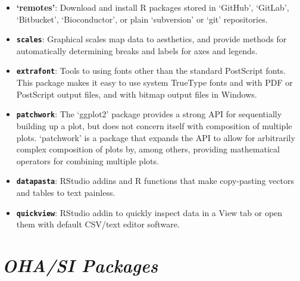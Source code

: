 \documentclass[
  letterpaper,
  DIV=11,
  numbers=noendperiod]{scrreprt}
\providecommand{\tightlist}{%
  \setlength{\itemsep}{0pt}\setlength{\parskip}{0pt}}\usepackage{longtable,booktabs,array}
\begin{document}
\begin{itemize}
\tightlist
\item
  \textbf{`remotes'}: Download and install R packages stored in
  `GitHub', `GitLab', `Bitbucket', `Bioconductor', or plain `subversion'
  or `git' repositories.
\item
  \textbf{\texttt{scales}}: Graphical scales map data to aesthetics, and
  provide methods for automatically determining breaks and labels for
  axes and legends.
\item
  \textbf{\texttt{extrafont}}: Tools to using fonts other than the
  standard PostScript fonts. This package makes it easy to use system
  TrueType fonts and with PDF or PostScript output files, and with
  bitmap output files in Windows.
\item
  \textbf{\texttt{patchwork}}: The `ggplot2' package provides a strong
  API for sequentially building up a plot, but does not concern itself
  with composition of multiple plots. `patchwork' is a package that
  expands the API to allow for arbitrarily complex composition of plots
  by, among others, providing mathematical operators for combining
  multiple plots.
\item
  \textbf{\texttt{datapasta}}: RStudio addins and R functions that make
  copy-pasting vectors and tables to text painless.
\item
  \textbf{\texttt{quickview}}: RStudio addin to quickly inspect data in
  a View tab or open them with default CSV/text editor software.
\end{itemize}

\hypertarget{ohasi-packages}{%
\section{\texorpdfstring{\emph{OHA/SI
Packages}}{OHA/SI Packages}}\label{ohasi-packages}}
\end{document}
